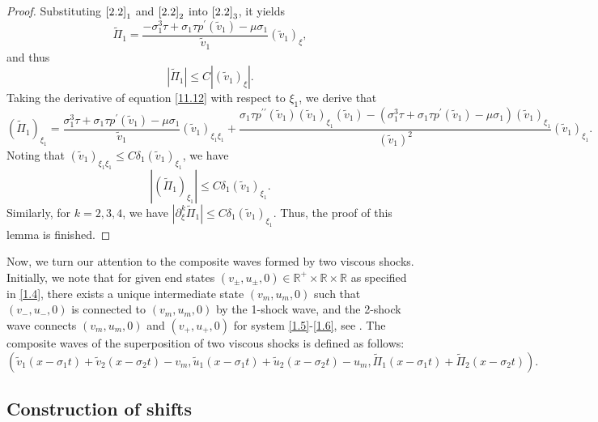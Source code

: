 \documentclass[10pt,reqno]{amsart}
\numberwithin{equation}{section}
\begin{document}
\begin{proof}
Substituting $\eqref{2.2}_1$ and $\eqref{2.2}_2$ into $\eqref{2.2}_3$, it yields
\begin{equation}\label{11.12}
\widetilde{\Pi}_1=\frac{-\sigma_1^3\tau+\sigma_1\tau p^{\prime}(\widetilde{v}_1)-\mu\sigma_1}{\widetilde{v}_1}(\widetilde{v}_1)_{\xi},
\end{equation}
and thus
\begin{equation}\label{eq29}
|\widetilde{\Pi}_1|\le C |(\widetilde{v}_1)_{\xi}|.
\end{equation}
Taking the derivative of equation \eqref{11.12} with respect to $\xi_1$, we derive that
\[
(\widetilde{\Pi}_1)_{\xi_1}=\frac{\sigma_1^3\tau+\sigma_1\tau p^{\prime}(\widetilde{v}_1)-\mu\sigma_1}{\widetilde{v}_1}(\widetilde{v}_1)_{\xi_1\xi_1}
+\frac{\sigma_1\tau p^{\prime\prime}(\widetilde{v}_1)(\widetilde{v}_1)_{\xi_1}(\widetilde{v}_1)-
(\sigma_1^3\tau+\sigma_1\tau p^{\prime}(\widetilde{v}_1)-\mu\sigma_1)(\widetilde{v}_1)_{\xi_1}}
{(\widetilde{v}_1)^2}(\widetilde{v}_1)_{\xi_1}.
\]
Noting that $(\widetilde{v}_1)_{\xi_1\xi_1}\le C\delta_1(\widetilde{v}_1)_{\xi_1}$, we have
\[
|(\widetilde{\Pi}_1)_{\xi_1}|\le C\delta_1(\widetilde{v}_1)_{\xi_1}.
\]
Similarly, for $k=2,3,4$,  we have $|\partial_{\xi}^k\widetilde{\Pi}_1|\le C\delta_1(\widetilde{v}_1)_{\xi_1}$. Thus,  the proof of this lemma is finished.
\end{proof}


Now, we turn our attention to the composite waves formed by two viscous shocks. Initially, we note that for given end states $(v_{\pm},u_{\pm},0)\in\mathbb{R}^+\times\mathbb{R}\times\mathbb{R}$ as specified in \eqref{1.4}, there exists a unique intermediate state $(v_m,u_m,0)$ such that $(v_-,u_-,0)$ is connected to $(v_m,u_m,0)$ by the 1-shock wave, and the 2-shock wave connects $(v_m,u_m,0)$ and $(v_+,u_+,0)$ for system \eqref{1.5}-\eqref{1.6}, see \cite{SMO}. The composite waves of the superposition of two viscous shocks is defined as follows:
\begin{equation}\label{2.9}
\left(\widetilde{v}_1(x-\sigma_1 t)+\widetilde{v}_2(x-\sigma_2 t)-v_m,
\widetilde{u}_1(x-\sigma_1 t)+\widetilde{u}_2(x-\sigma_2 t)-u_m,
\widetilde{\Pi}_1(x-\sigma_1 t)+\widetilde{\Pi}_2(x-\sigma_2 t)\right).
\end{equation}

\subsection{Construction of shifts}
\end{document}
